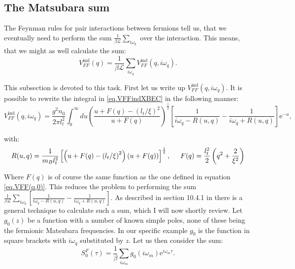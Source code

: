 \subsection{The Matsubara sum}
The Feynman rules for pair interactions between fermions tell us, that we eventually need to perform the sum $\frac{1}{\beta \mathcal{L}}\sum_{i\omega_q}$ over the interaction. This means, that we might as well calculate the sum:
\begin{equation}
V^\text{ind}_{FF}(q) = \frac{1}{\beta\mathcal{L}}\sum_{i\omega_q} V^\text{ind}_{FF}(q,i\omega_q).
\end{equation}  

This subsection is devoted to this task. First let us write up $V^\text{ind}_{FF}(q,i\omega_q)$. It is possible to rewrite the integral in \eqref{eq.VFFindXBEC} in the following manner:
\begin{equation}
V^\text{ind}_{FF}(q,i\omega_q) = \frac{g^2n_0}{2\pi l_t^2}\int_0^\infty du \left(\frac{u+F(q)-\left(l_t/\xi\right)^2}{u+F(q)}\right)^{\frac{1}{2}}\left[\frac{1}{i\omega_q-R(u,q)}-\frac{1}{i\omega_q+R(u,q)}\right]\text{e}^{-u},
\label{eq.VFFindomega}
\end{equation}

with: 
\begin{equation}
R(u,q) = \frac{1}{m_B l_t^2}\left[\left(u+F(q)-\left(l_t/\xi\right)^2\right)\left(u+F(q)\right)\right]^{\frac{1}{2}}, \hspace{0.5cm} F(q) = \frac{l_t^2}{2}\left(q^2+\frac{2}{\xi^2} \right)
\label{eq.Ruq}
\end{equation}

Where $F(q)$ is of course the same function as the one defined in equation \eqref{eq.VFF(q,0)}. This reduces the problem to performing the sum $\frac{1}{\beta \mathcal{L}}\sum_{i\omega_q}\left[\frac{1}{i\omega_q-R(u,q)}-\frac{1}{i\omega_q+R(u,q)}\right]$. As described in section 10.4.1 in \cite{BruusFlensberg} there is a general technique to calculate such a sum, which I will now shortly review. Let $g_0(z)$ be a function with a number of known simple poles, none of these being the fermionic Matsubara frequencies. In our specific example $g_0$ is the function in square brackets with $i\omega_q$ substituted by $z$. Let us then consider the sum:
\begin{equation}
S^F_0(\tau) = \frac{1}{\beta}\sum_{i\omega_m}g_0(i\omega_m)\text{e}^{i\omega_m\tau}. \nonumber
\end{equation}

